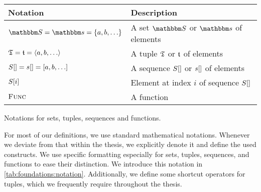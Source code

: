 \begin{propertable}
    \begin{tabular}{L{10em} L{17em}}
        \toprule
        \textbf{Notation} & \textbf{Description} \\
        \midrule
        $\set{S} = \set{s} = \setted{a, b, \ldots}$ 
            & A set $\set{S}$ or $\set{s}$ of elements\\
        $\mathfrak{T} = \mathfrak{t} = \langle a, b, \ldots \rangle$ 
            & A tuple $\mathfrak{T}$ or $\mathfrak{t}$ of elements\\
        $S[] = s[] = [a, b, \ldots]$ 
            & A sequence $S[]$ or $s[]$ of elements\\
        $S[i]$ 
            & Element at index $i$ of sequence $S[]$\\
        $\textsc{Func}$ 
            & A function\\
        \bottomrule
    \end{tabular}
    \caption[Notations for sets, tuples, sequences and functions]{Notations for sets, tuples, sequences and functions.}
    \label{tab:foundations:notation}
\end{propertable}

For most of our definitions, we use standard mathematical notations.
Whenever we deviate from that within the thesis, we explicitly denote it and define the used constructs.
We use specific formatting especially for sets, tuples, sequences, and functions to ease their distinction.
We introduce this notation in \autoref{tab:foundations:notation}.
Additionally, we define some shortcut operators for tuples, which we frequently require throughout the thesis.


